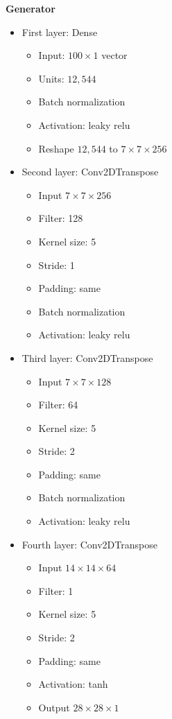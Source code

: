 \documentclass{article}
\begin{document}
\begin{multicols*}{2}
\textbf{Generator}
 \begin{itemize}
  \item First layer: Dense
    \begin{itemize}
      \item Input: $100 \times 1$ vector
      \item Units: $12,544$
      \item Batch normalization
      \item Activation: leaky relu
      \item Reshape $12,544$ to $7\times 7\times 256$
    \end{itemize}
  \item Second layer: Conv2DTranspose
    \begin{itemize}
      \item Input $7\times 7\times 256$
      \item Filter: 128
      \item Kernel size: 5
      \item Stride: 1
      \item Padding: same
      \item Batch normalization
      \item Activation: leaky relu
  \end{itemize} 
  \item Third layer: Conv2DTranspose
    \begin{itemize}
      \item Input $7\times 7\times 128$
      \item Filter: 64
      \item Kernel size: 5
      \item Stride: 2
      \item Padding: same
      \item Batch normalization
      \item Activation: leaky relu
    \end{itemize}   
  \item Fourth layer: Conv2DTranspose
    \begin{itemize}
      \item Input $14\times 14\times 64$
      \item Filter: 1
      \item Kernel size: 5
      \item Stride: 2
      \item Padding: same
      \item Activation: tanh
      \item Output $28\times 28\times 1$
    \end{itemize}   
\end{itemize}


\end{multicols*}
\end{document}
